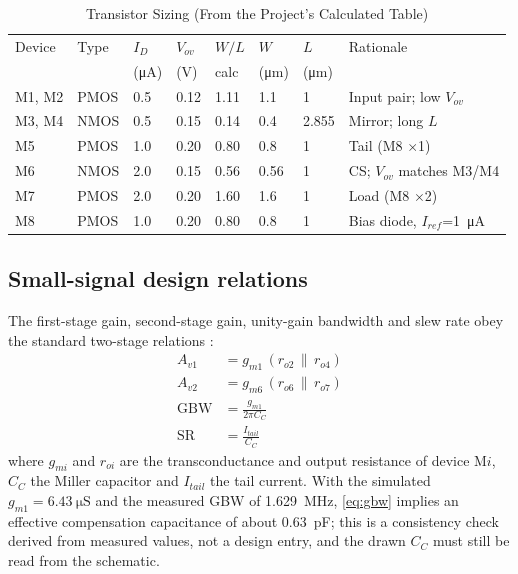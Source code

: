 \documentclass[conference]{IEEEtran}
\begin{document}
\begin{table}[!t]
\caption{Transistor Sizing (From the Project's Calculated Table)}
\label{tab:size}
\centering\footnotesize
\begin{tabular}{@{}llllllll@{}}
\toprule
Device & Type & $I_D$ & $V_{ov}$ & $W/L$ & $W$ & $L$ & Rationale \\
 & & (\si{\micro\ampere}) & (V) & calc & (\si{\micro\metre}) & (\si{\micro\metre}) & \\
\midrule
M1, M2 & PMOS & 0.5 & 0.12 & 1.11 & 1.1 & 1 & Input pair; low $V_{ov}$ \\
M3, M4 & NMOS & 0.5 & 0.15 & 0.14 & 0.4 & 2.855 & Mirror; long $L$ \\
M5 & PMOS & 1.0 & 0.20 & 0.80 & 0.8 & 1 & Tail (M8 $\times$1) \\
M6 & NMOS & 2.0 & 0.15 & 0.56 & 0.56 & 1 & CS; $V_{ov}$ matches M3/M4 \\
M7 & PMOS & 2.0 & 0.20 & 1.60 & 1.6 & 1 & Load (M8 $\times$2) \\
M8 & PMOS & 1.0 & 0.20 & 0.80 & 0.8 & 1 & Bias diode, $I_{ref}$=\SI{1}{\micro\ampere} \\
\bottomrule
\end{tabular}
\end{table}

\subsection{Small-signal design relations}
The first-stage gain, second-stage gain, unity-gain bandwidth and slew rate
obey the standard two-stage relations \cite{gray,allen}:
\begin{align}
A_{v1} &= g_{m1}\,(r_{o2}\,\|\,r_{o4}) \label{eq:av1}\\
A_{v2} &= g_{m6}\,(r_{o6}\,\|\,r_{o7}) \label{eq:av2}\\
\mathrm{GBW} &= \frac{g_{m1}}{2\pi C_C} \label{eq:gbw}\\
\mathrm{SR} &= \frac{I_{tail}}{C_C} \label{eq:sr}
\end{align}
where $g_{mi}$ and $r_{oi}$ are the transconductance and output resistance of
device M$i$, $C_C$ the Miller capacitor and $I_{tail}$ the tail current. With
the simulated $g_{m1} = \SI{6.43}{\micro\siemens}$ and the measured GBW of
\SI{1.629}{\mega\hertz}, \eqref{eq:gbw} implies an effective compensation
capacitance of about \SI{0.63}{\pico\farad}; this is a consistency check
derived from measured values, not a design entry, and the drawn $C_C$ must
still be read from the schematic.
\end{document}
